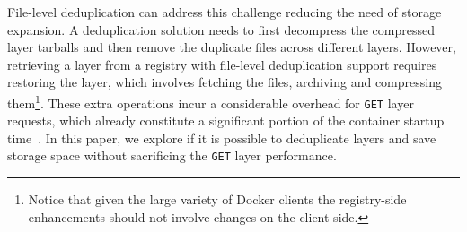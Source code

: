 File-level deduplication can address this challenge reducing the need of storage expansion.
%
A deduplication solution needs to first decompress
the compressed layer tarballs and then remove the duplicate files across
different layers.
%
%
However, retrieving a layer from a registry with file-level
deduplication support requires restoring the layer,
which involves fetching the files, archiving and compressing them\footnote{Notice
that given the large variety of Docker clients the registry-side enhancements
should not involve changes on the client-side.}.
%
These extra operations incur a considerable overhead for
\texttt{GET} layer requests, which already constitute a significant portion of
the container startup time~\cite{slacker}.
%
In this paper, we explore if it is possible to deduplicate layers and save storage space
without sacrificing the \texttt{GET} layer performance.
%   



